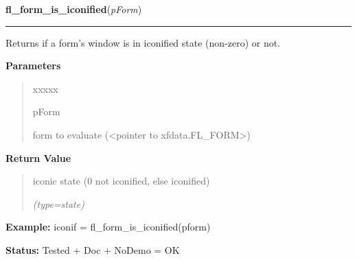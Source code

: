 \hspace{.8\funcindent}\begin{boxedminipage}{\funcwidth}

    \raggedright \textbf{fl\_form\_is\_iconified}(\textit{pForm})

    \vspace{-1.5ex}

    \rule{\textwidth}{0.5\fboxrule}
\setlength{\parskip}{2ex}
    Returns if a form's window is in iconified state (non-zero) or not.

\setlength{\parskip}{1ex}
      \textbf{Parameters}
      \vspace{-1ex}

      \begin{quote}
        \begin{Ventry}{xxxxx}

          \item[pForm]

          form to evaluate ({\textless}pointer to 
          xfdata.FL\_FORM{\textgreater})

        \end{Ventry}

      \end{quote}

      \textbf{Return Value}
    \vspace{-1ex}

      \begin{quote}
      iconic state (0 not iconified, else iconified)

      {\it (type=state)}

      \end{quote}

\textbf{Example:} iconif = fl\_form\_is\_iconified(pform)



\textbf{Status:} Tested + Doc + NoDemo = OK



    \end{boxedminipage}

    \label{xformslib:library:fl_register_raw_callback}

    \vspace{0.5ex}

